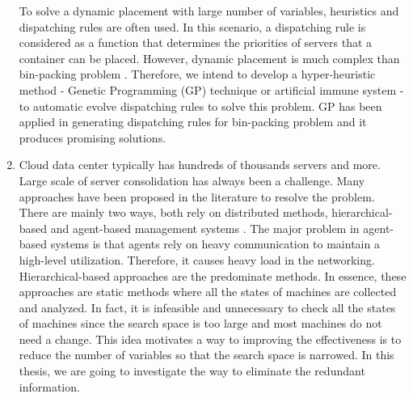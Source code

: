 \begin{enumerate}
	To solve a dynamic placement with large number of variables, heuristics and dispatching rules are often used\cite{Sarin:2011fu}.  In this scenario, a dispatching rule is considered as a function that determines the priorities of servers that a container can be placed. However, dynamic placement is much complex than bin-packing problem \cite{Mann:2015ua}. Therefore, we intend to develop a hyper-heuristic method - Genetic Programming (GP) technique \cite{Banzhaf:1998wc} or artificial immune system \cite{Hofmeyr:2000ju}- to automatic evolve dispatching rules to solve this problem. GP has been applied in generating dispatching rules for bin-packing problem \cite{Burke:2006ei, SoteloFigueroa:2013be} and it produces promising solutions.

\item Cloud data center typically has hundreds of thousands servers and more. 
	Large scale of server consolidation has always been a challenge. 
 	Many approaches have been proposed in the literature to resolve the problem. There are mainly two ways, both rely on distributed methods, hierarchical-based \cite{Jung:2010dt, Moens:2011gk} and agent-based management systems \cite{Yazir:2010bk}.
	The major problem in agent-based systems is that agents rely on heavy communication to maintain a high-level utilization. Therefore, it causes heavy load in the networking. Hierarchical-based approaches are the predominate methods. In essence, these approaches are static methods where all the states of machines are collected and analyzed. In fact, it is infeasible and unnecessary to check all the states of machines since the search space is too large and most machines do not need a change. This idea
	motivates a way to improving the effectiveness is to reduce the number of variables so that the search space is narrowed. In this thesis, we are going to investigate the way to eliminate the redundant information.
\end{enumerate}





